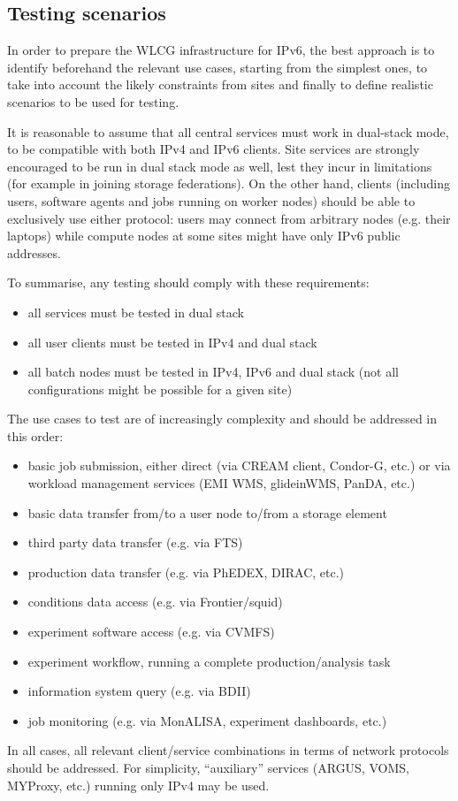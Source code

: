 \subsection{Testing scenarios}
In order to prepare the WLCG infrastructure for IPv6, the best
approach is to identify beforehand the relevant use cases, starting
from the simplest ones, to take into account the likely constraints
from sites and finally to define realistic scenarios to be used for
testing.

It is reasonable to assume that all central services must work in
dual-stack mode, to be compatible with both IPv4 and IPv6
clients. Site services are strongly encouraged to be run in dual stack
mode as well, lest they incur in limitations (for example in joining
storage federations). On the other hand, clients (including users,
software agents and jobs running on worker nodes) should be able to
exclusively use either protocol: users may connect from arbitrary
nodes (e.g. their laptops) while compute nodes at some sites might have
only IPv6 public addresses.

To summarise, any testing should comply with these requirements:
\begin{itemize}
\item all services must be tested in dual stack
\item all user clients must be tested in IPv4 and dual stack
\item all batch nodes must be tested in IPv4, IPv6 and dual stack (not all configurations might be possible for a given site)
\end{itemize}

The use cases to test are of increasingly complexity and should be addressed in this order:
\begin{itemize}
\item basic job submission, either direct (via CREAM client, Condor-G, etc.) or via workload management services (EMI WMS, glideinWMS, PanDA, etc.)
\item basic data transfer from/to a user node to/from a storage element
\item third party data transfer (e.g. via FTS)
\item production data transfer (e.g. via PhEDEX, DIRAC, etc.)
\item conditions data access (e.g. via Frontier/squid)
\item experiment software access (e.g. via CVMFS)
\item experiment workflow, running a complete production/analysis task
\item information system query (e.g. via BDII)
\item job monitoring (e.g. via MonALISA, experiment dashboards, etc.)
\end{itemize}
In all cases, all relevant client/service combinations in terms of network protocols should be addressed. For simplicity, ``auxiliary'' services (ARGUS, VOMS, MYProxy, etc.) running only IPv4 may be used.


